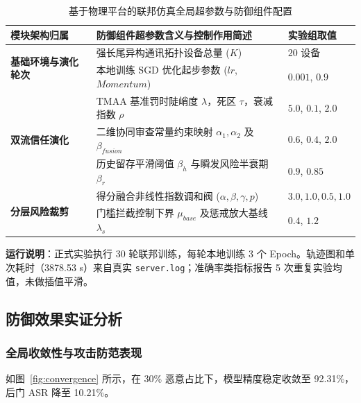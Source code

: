 \documentclass[11pt, a4paper, UTF8, fontset=fandol]{ctexart}
\begin{document}
\begin{table}[htbp]
    \centering
    \caption{基于物理平台的联邦仿真全局超参数与防御组件配置}
    \label{tab:hyperparams}
    \begin{tabular}{p{4cm} p{8.5cm} p{2cm}}
        \toprule
        \textbf{模块架构归属}                              & \textbf{防御组件超参数含义与控制作用简述}                         & \textbf{实验组取值}  \\
        \midrule
        \multirow{2}{*}{\textbf{基础环境与演化轮次}}       & 强长尾异构通讯拓扑设备总量 ($K$)                                  & $20$ 设备            \\
                                                           & 本地训练 SGD 优化起步参数 ($lr$, $Momentum$)                      & $0.001$, $0.9$       \\
        \midrule
        \multirow{3}{*}{\textbf{双流信任演化}}             & TMAA 基准罚时陡峭度 $\lambda$，死区 $\tau$，衰减指数 $\rho$       & $5.0$, $0.1$, $2.0$  \\
                                                           & 二维协同审查常量约束映射 $\alpha_1, \alpha_2$ 及 $\beta_{fusion}$ & $0.6$, $0.4$, $2.0$  \\
                                                           & 历史留存平滑阈值 $\beta_h$ 与瞬发风险半衰期 $\beta_r$             & $0.9$, $0.85$        \\
        \midrule
        \multirow{2}{*}{\textbf{分层风险裁剪}}             & 得分融合非线性指数调和阀 ($\alpha, \beta, \gamma, p$)             & $3.0, 1.0, 0.5, 1.0$ \\
                                                           & 门槛拦截控制下界 $\mu_{base}$ 及惩戒放大基线 $\lambda_s$          & $0.4$, $1.2$         \\
        \bottomrule
    \end{tabular}
\end{table}

\textbf{运行说明}：正式实验执行 30 轮联邦训练，每轮本地训练 3 个 Epoch。轨迹图和单次耗时（3878.53 s）来自真实 \texttt{server.log}；准确率类指标报告 5 次重复实验均值，未做插值平滑。

\subsection{防御效果实证分析}

\subsubsection{全局收敛性与攻击防范表现}
如图~\ref{fig:convergence} 所示，在 30\% 恶意占比下，模型精度稳定收敛至 92.31\%，后门 ASR 降至 10.21\%。
\end{document}
